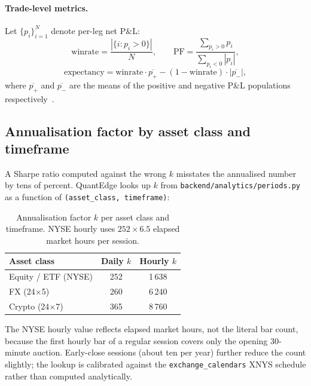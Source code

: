 \paragraph{Trade-level metrics.} Let $\{p_i\}_{i=1}^{N}$ denote per-leg net P\&L:
\begin{equation}
  \mathrm{winrate} = \frac{|\{i:p_i > 0\}|}{N},\qquad
  \mathrm{PF} = \frac{\sum_{p_i > 0} p_i}{\sum_{p_i < 0} |p_i|},
\end{equation}
\begin{equation}
  \mathrm{expectancy} = \mathrm{winrate}\cdot \overline{p_{+}} - (1-\mathrm{winrate}) \cdot |\overline{p_{-}}|,
\end{equation}
where $\overline{p_{+}}$ and $\overline{p_{-}}$ are the means of the positive and
negative P\&L populations respectively~\cite{pardo2008,tharp1998}.

\subsection{Annualisation factor by asset class and timeframe}
\label{sec:calendars}

A Sharpe ratio computed against the wrong $k$ misstates the annualised number by
tens of percent. QuantEdge looks up $k$ from
\texttt{backend/analytics/periods.py} as a function of \texttt{(asset\_class,
timeframe)}:

\begin{table}[h]
\centering
\small
\begin{tabular}{lcc}
\toprule
\textbf{Asset class} & \textbf{Daily $k$} & \textbf{Hourly $k$} \\
\midrule
Equity / ETF (NYSE) & 252  & 1\,638 \\
FX (24$\times$5)    & 260  & 6\,240 \\
Crypto (24$\times$7)& 365  & 8\,760 \\
\bottomrule
\end{tabular}
\caption{Annualisation factor $k$ per asset class and timeframe. NYSE hourly uses
$252 \times 6.5$ elapsed market hours per session.}
\end{table}

The NYSE hourly value reflects elapsed market hours, not the literal bar count,
because the first hourly bar of a regular session covers only the opening
30-minute auction. Early-close sessions (about ten per year) further reduce the
count slightly; the lookup is calibrated against the
\texttt{exchange\_calendars} XNYS schedule rather than computed analytically.

